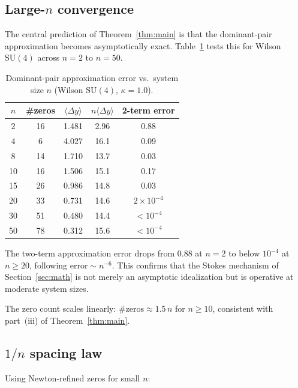\documentclass[12pt]{article}
\theoremstyle{definition}
\theoremstyle{remark}
\newcommand{\SU}{\mathrm{SU}}
\newcommand{\avg}[1]{\langle #1 \rangle}
\begin{document}
\subsection{Large-$n$ convergence}

The central prediction of Theorem~\ref{thm:main} is that the
dominant-pair approximation becomes asymptotically exact.
Table~\ref{tab:large_n} tests this for Wilson $\SU(4)$ across
$n = 2$ to $n = 50$.

\begin{table}[h]
\centering
\caption{Dominant-pair approximation error vs.\ system size $n$
  (Wilson $\SU(4)$, $\kappa = 1.0$).}
\label{tab:large_n}
\begin{tabular}{ccccc}
\toprule
$n$ & \#zeros & $\avg{\Delta y}$ & $n\avg{\Delta y}$ &
  2-term error \\
\midrule
2  & 16 & 1.481 & 2.96 & 0.88 \\
4  &  6 & 4.027 & 16.1 & 0.09 \\
8  & 14 & 1.710 & 13.7 & 0.03 \\
10 & 16 & 1.506 & 15.1 & 0.17 \\
15 & 26 & 0.986 & 14.8 & 0.03 \\
20 & 33 & 0.731 & 14.6 & $2\times 10^{-4}$ \\
30 & 51 & 0.480 & 14.4 & $< 10^{-4}$ \\
50 & 78 & 0.312 & 15.6 & $< 10^{-4}$ \\
\bottomrule
\end{tabular}
\end{table}

The two-term approximation error drops from $0.88$ at $n = 2$ to
below $10^{-4}$ at $n \geq 20$, following $\text{error} \sim n^{-6}$.
This confirms that the Stokes mechanism of
Section~\ref{sec:math} is not merely an asymptotic idealization
but is operative at moderate system sizes.

The zero count scales linearly: $\#\text{zeros} \approx 1.5\,n$ for
$n \geq 10$, consistent with part~(iii) of Theorem~\ref{thm:main}.

\subsection{$1/n$ spacing law}

Using Newton-refined zeros for small $n$:
\end{document}
